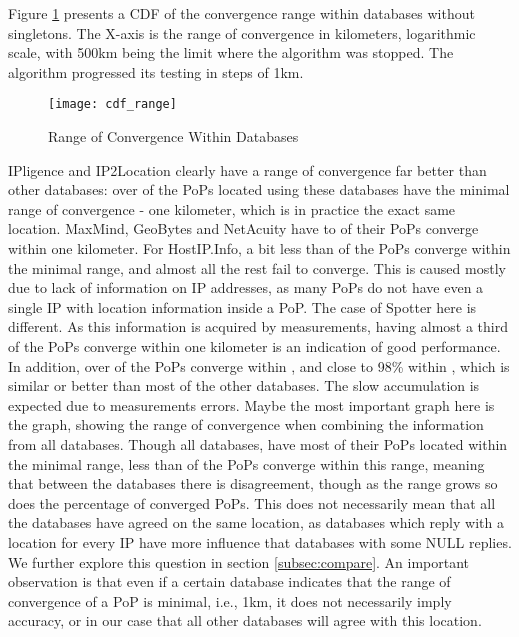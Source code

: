 Figure \ref{fig:cdf_range} presents a CDF of the convergence range
within databases without singletons. The X-axis is the range of
convergence in kilometers, logarithmic scale, with 500km being the
limit where the algorithm was stopped. The algorithm progressed its
testing in steps of 1km.
\begin{figure}
\begin{minipage}[b]{\linewidth}
\centering
\texttt{[image: cdf\_range]}
\caption{Range of Convergence Within Databases}
\label{fig:cdf_range}
\end{minipage}
\end{figure}


IPligence and IP2Location clearly have a range of convergence far
better than other databases: over  of the PoPs located using
these databases have the minimal range of convergence - one
kilometer, which is in practice the exact same location. MaxMind,
GeoBytes and NetAcuity have  to  of their PoPs converge
within one kilometer. For HostIP.Info, a bit less than  of the
PoPs converge within the minimal range, and almost all the rest fail
to converge. This is caused mostly due to lack of information on IP
addresses, as many PoPs do not have even a single IP with location
information inside a PoP. The case of Spotter here is different. As
this information is acquired by measurements, having almost a third
of the PoPs converge within one kilometer is an indication of good
performance. In addition, over  of the PoPs converge within
, and close to 98\% within , which is similar or
better than most of the other databases. The slow accumulation is
expected due to measurements errors. Maybe the most important graph
here is the  graph, showing the range of convergence when
combining the information from all databases. Though all databases,
have most of their PoPs located within the minimal range, less than
 of the  PoPs converge within this range, meaning that
between the databases there is disagreement, though as the range
grows so does the percentage of converged PoPs. This does not
necessarily mean that all the databases have agreed on the same
location, as databases which reply with a location for every IP have
more influence that databases with some NULL replies. We further
explore this question in section \ref{subsec:compare}. An important
observation is that even if a certain database indicates that the
range of convergence of a PoP is minimal, i.e., 1km, it does not
necessarily imply accuracy, or in our case that all other databases
will agree with this location.



